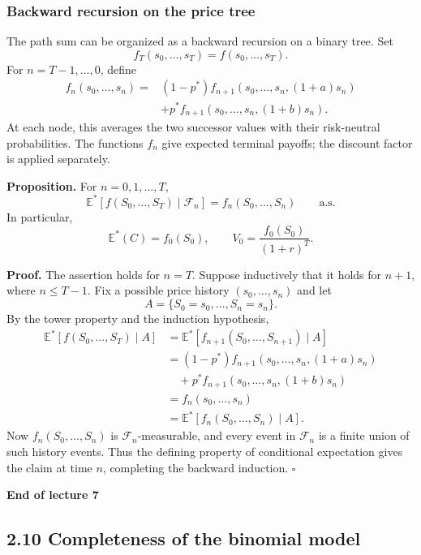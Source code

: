 \documentclass[11pt,a4paper]{article}
\begin{document}
\subsubsection*{Backward recursion on the price tree}

The path sum can be organized as a backward recursion on a binary
tree. Set
\[
f_T(s_0,\ldots,s_T)=f(s_0,\ldots,s_T).
\]
For $n=T-1,\ldots,0$, define
\[
\begin{aligned}
f_n(s_0,\ldots,s_n)
={}&(1-p^*)f_{n+1}(s_0,\ldots,s_n,(1+a)s_n)\\
&+p^*f_{n+1}(s_0,\ldots,s_n,(1+b)s_n).
\end{aligned}
\]
At each node, this averages the two successor values with their
risk-neutral probabilities. The functions $f_n$ give expected
terminal payoffs; the discount factor is applied separately.

\medskip
\noindent\textbf{Proposition.}
For $n=0,1,\ldots,T$,
\[
\mathbb E^*\!\left[f(S_0,\ldots,S_T)\mid\mathcal F_n\right]
=f_n(S_0,\ldots,S_n)\qquad\text{a.s.}
\]
In particular,
\[
\mathbb E^*(C)=f_0(S_0),\qquad
V_0=\frac{f_0(S_0)}{(1+r)^T}.
\]

\noindent\textbf{Proof.}
The assertion holds for $n=T$. Suppose inductively that it holds
for $n+1$, where $n\leq T-1$. Fix a possible price history
$(s_0,\ldots,s_n)$ and let
\[
A=\{S_0=s_0,\ldots,S_n=s_n\}.
\]
By the tower property and the induction hypothesis,
\[
\begin{aligned}
\mathbb E^*\!\left[f(S_0,\ldots,S_T)\mid A\right]
&=\mathbb E^*\!\left[f_{n+1}(S_0,\ldots,S_{n+1})\mid A\right]\\
&=(1-p^*)f_{n+1}(s_0,\ldots,s_n,(1+a)s_n)\\
&\quad+p^*f_{n+1}(s_0,\ldots,s_n,(1+b)s_n)\\
&=f_n(s_0,\ldots,s_n)\\
&=\mathbb E^*\!\left[f_n(S_0,\ldots,S_n)\mid A\right].
\end{aligned}
\]
Now $f_n(S_0,\ldots,S_n)$ is $\mathcal F_n$-measurable, and every
event in $\mathcal F_n$ is a finite union of such history events.
Thus the defining property of conditional expectation gives the
claim at time $n$, completing the backward induction.
\hfill$\square$

\begin{center}
\textbf{End of lecture 7}
\end{center}

\subsection*{2.10 Completeness of the binomial model}
\end{document}
